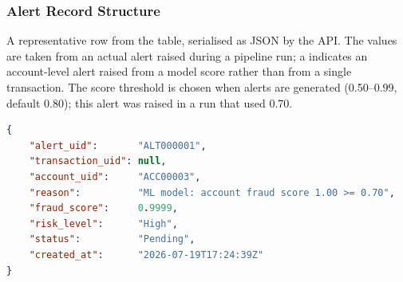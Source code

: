 \subsubsection*{Alert Record Structure}
A representative row from the  table, serialised as JSON by the API. The values are taken from an actual alert raised during a pipeline run; a   indicates an account-level alert raised from a model score rather than from a single transaction. The score threshold is chosen when alerts are generated (0.50--0.99, default 0.80); this alert was raised in a run that used 0.70.

\begin{lstlisting}[language=json, caption={Alert record as returned by the API (valid JSON)}, label=lst:alert]
{
    "alert_uid":       "ALT000001",
    "transaction_uid": null,
    "account_uid":     "ACC00003",
    "reason":          "ML model: account fraud score 1.00 >= 0.70",
    "fraud_score":     0.9999,
    "risk_level":      "High",
    "status":          "Pending",
    "created_at":      "2026-07-19T17:24:39Z"
}
\end{lstlisting}

